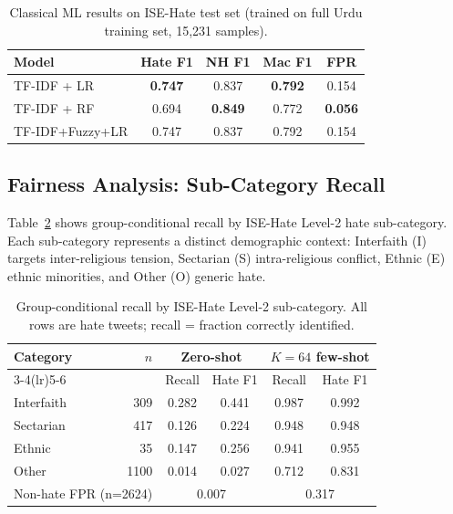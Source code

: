\documentclass{article}
\begin{document}
\begin{table}[h]
\centering
\caption{Classical ML results on ISE-Hate test set (trained on full
         Urdu training set, 15{,}231 samples).}
\label{tab:classical_results}
\vskip 0.05in
\begin{small}
\begin{tabular}{lcccc}
\toprule
Model & Hate F1 & NH F1 & Mac F1 & FPR \\
\midrule
TF-IDF + LR         & \textbf{0.747} & 0.837 & \textbf{0.792} & 0.154 \\
TF-IDF + RF         & 0.694 & \textbf{0.849} & 0.772 & \textbf{0.056} \\
TF-IDF+Fuzzy+LR     & 0.747 & 0.837 & 0.792 & 0.154 \\
\bottomrule
\end{tabular}
\end{small}
\end{table}

\subsection{Fairness Analysis: Sub-Category Recall}
\label{sec:fairness}

Table~\ref{tab:fairness} shows group-conditional recall by ISE-Hate
Level-2 hate sub-category.
Each sub-category represents a distinct demographic context:
Interfaith (I) targets inter-religious tension, Sectarian (S) intra-religious
conflict, Ethnic (E) ethnic minorities, and Other (O) generic hate.

\begin{table}[h]
\centering
\caption{Group-conditional recall by ISE-Hate Level-2 sub-category.
         All rows are hate tweets; recall = fraction correctly identified.}
\label{tab:fairness}
\vskip 0.05in
\begin{small}
\begin{tabular}{lrcccc}
\toprule
\multirow{2}{*}{Category} & \multirow{2}{*}{$n$} &
  \multicolumn{2}{c}{Zero-shot} & \multicolumn{2}{c}{$K=64$ few-shot} \\
\cmidrule(lr){3-4}\cmidrule(lr){5-6}
& & Recall & Hate F1 & Recall & Hate F1 \\
\midrule
Interfaith  & 309  & 0.282 & 0.441 & 0.987 & 0.992 \\
Sectarian   & 417  & 0.126 & 0.224 & 0.948 & 0.948 \\
Ethnic      &  35  & 0.147 & 0.256 & 0.941 & 0.955 \\
Other       & 1100 & 0.014 & 0.027 & 0.712 & 0.831 \\
\midrule
\multicolumn{2}{l}{Non-hate FPR (n=2624)} & \multicolumn{2}{c}{0.007} & \multicolumn{2}{c}{0.317} \\
\bottomrule
\end{tabular}
\end{small}
\end{table}
\end{document}

